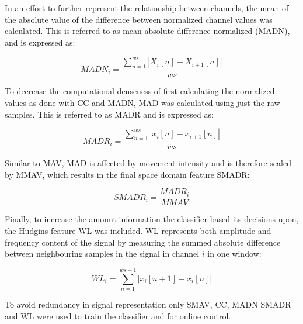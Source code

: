 In an effort to further represent the relationship between channels, the mean of the absolute value of the difference between normalized channel values was calculated. This is referred to as mean absolute difference normalized (MADN), and is expressed as:

\begin{equation} \label{eq:MADN}
MADN_i=\frac{\sum\limits_{n=1}^{ws}|X_i[n]-X_{i+1}[n]|}{ws}
\end{equation}

To decrease the computational denseness of first calculating the normalized values as done with CC and MADN, MAD was calculated using just the raw samples. This is referred to as MADR and is expressed as:

\begin{equation} \label{eq:MADR}
MADR_i=\frac{\sum\limits_{n=1}^{ws}|x_i[n]-x_{i+1}[n]|}{ws}
\end{equation}

Similar to MAV, MAD is affected by movement intensity and is therefore scaled by MMAV, which results in the final space domain feature SMADR: 

\begin{equation} \label{eq:SMADR}
SMADR_i=\frac{MADR_i}{MMAV}
\end{equation}

Finally, to increase the amount information the classifier based its decisions upon, the Hudgins feature WL was included. WL represents both amplitude and frequency content of the signal by measuring the summed absolute difference between neighbouring samples in the signal in channel $i$ in one window: 

\begin{equation} \label{eq:WL}
WL_i=\sum\limits_{n=1}^{ws-1}|x_{i}[n+1]-x_i[n]|
\end{equation}

To avoid redundancy in signal representation only SMAV, CC, MADN SMADR and WL were used to train the classifier and for online control. 
